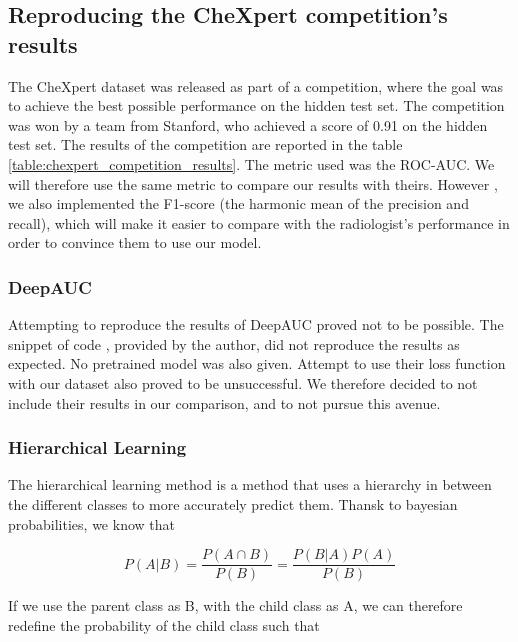 \documentclass[11pt]{article}
\begin{document}
        \subsection{Reproducing the CheXpert competition's results}

            The CheXpert dataset was released as part of a competition, where the goal was to achieve the best possible performance on the hidden test set. The competition was won by a team from Stanford, who achieved a score of 0.91 on the hidden test set. The results of the competition are reported in the table \ref{table:chexpert_competition_results}.
            The metric used was the ROC-AUC. We will therefore use the same metric to compare our results with theirs. However , we also implemented the
            F1-score (the harmonic mean of the precision and recall), which will make it easier to compare with the radiologist's performance
            in order to convince them to use our model.


            \subsubsection{DeepAUC \cite{DeepAUC}}

                Attempting to reproduce the results of DeepAUC \cite{DeepAUC} proved not to be possible. The snippet of code , provided by the author,
                did not reproduce the results as expected. No pretrained model was also given. Attempt to use their loss function with our dataset also proved
                to be unsuccessful. We therefore decided to not include their results in our comparison, and to not pursue this avenue.

            \subsubsection{Hierarchical Learning \cite{hierarchical}}

                    The hierarchical learning method \cite{hierarchical} is a method that uses a hierarchy in between the different classes
                    to more accurately predict them. Thansk to bayesian probabilities, we know that

                    \begin{equation}
                        P(A|B) = \frac{P(A \cap B)}{P(B)} = \frac{P(B|A) P(A)}{P(B)}
                    \end{equation}

                    If we use the parent class as B, with the child class as A, we can therefore redefine
                    the probability of the child class such that
\end{document}
